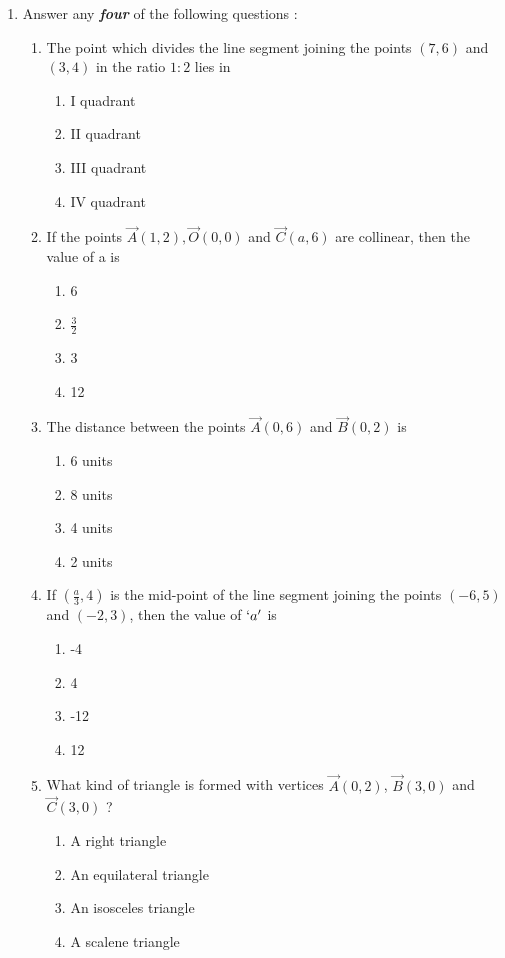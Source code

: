 \documentclass{article}
\begin{document}
\begin{enumerate}
\item Answer any \textbf{\textit{four}} of the following questions : 		
\begin{enumerate}
\item The point which divides the line segment joining the points $(7, 6)$ and $(3, 4)$ in the ratio $1 : 2$ lies in
	\begin{enumerate}
	\item I quadrant 
	\item II quadrant 
	\item III quadrant  
	\item IV quadrant
	\end{enumerate}
\item  If the points $\vec{A}(1, 2), \vec{O}(0, 0)$ and $\vec{C}(a, 6)$ are collinear, then the value of a is 
	\begin{enumerate}
	\item 6
	\item $\frac{3}{2}$
	\item 3
	\item 12
	\end{enumerate}
\item  The distance between the points $\vec{A}(0, 6)$ and $\vec{B}(0, 2)$ is 
	\begin{enumerate}
	\item 6 units
	\item 8 units
	\item 4 units
	\item 2 units
	\end{enumerate}
\item  If $(\frac{a}{3},4)$ is the mid-point of the line segment joining the points $(-6, 5)$ and $(-2, 3)$, then the value of ${\lq a\rq}$ is
	\begin{enumerate}
	\item -4
	\item 4
	\item -12
	\item 12
	\end{enumerate}
\item  What kind of triangle is formed with vertices $\vec{A}(0, 2)$, $\vec{B}(3, 0)$ and $\vec{C}(3, 0)$ ? 
	\begin{enumerate}
	\item A right triangle 
	\item An equilateral triangle
	\item An isosceles triangle 
	\item A scalene triangle 
	\end{enumerate}
\end{enumerate}
		

\end{enumerate}
\end{document}
